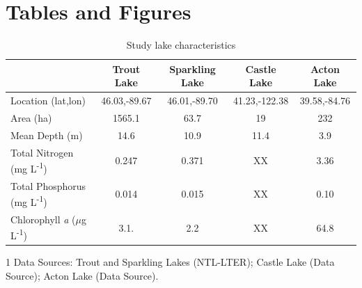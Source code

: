 \documentclass[12pt, oneside]{article}
\begin{document}
\section*{Tables and Figures}
\begin{table}[h]
\begin{threeparttable}
\caption{Study lake characteristics}
\label{tab:table1}
\begin{tabular}{@{}lcccc@{}}
\toprule
                    & Trout Lake    & Sparkling Lake    & Castle Lake   & Acton Lake    \\ \midrule
Location (lat,lon)  & 46.03,-89.67  & 46.01,-89.70      & 41.23,-122.38 & 39.58,-84.76  \\
Area (ha)           & 1565.1        & 63.7              &  19           &    232        \\
Mean Depth (m)      & 14.6          &    10.9           &   11.4          &    3.9        \\
Total Nitrogen (mg L\textsuperscript{-1})           & 0.247 & 0.371 & XX    & 3.36        \\
Total Phosphorus (mg L\textsuperscript{-1})         & 0.014 & 0.015 & XX    & 0.10        \\
Chlorophyll \emph{a} ($\mu$g L\textsuperscript{-1}) & 3.1.  & 2.2   & XX    & 64.8        \\ \bottomrule
\end{tabular}
     \begin{tablenotes}
     \item[1] Data Sources: Trout and Sparkling Lakes (NTL-LTER); Castle Lake (Data Source); Acton Lake (Data Source).
   \end{tablenotes}
\end{threeparttable}
\end{table} %
\end{document}
